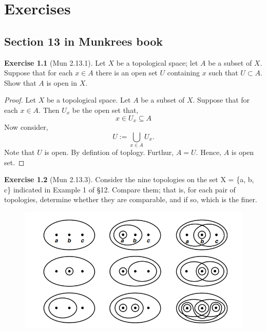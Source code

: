 \documentclass[
]{book}
\theoremstyle{definition}
\theoremstyle{definition}
\theoremstyle{definition}
\newtheorem{exercise}{Exercise}[chapter]
\theoremstyle{definition}
\theoremstyle{remark}
\begin{document}
\hypertarget{exercises}{%
\chapter{Exercises}\label{exercises}}

\hypertarget{section-13-in-munkrees-book}{%
\section{Section 13 in Munkrees book}\label{section-13-in-munkrees-book}}

\begin{exercise}[Mun 2.13.1]
\protect\hypertarget{exr:unnamed-chunk-95}{}\label{exr:unnamed-chunk-95}Let \(X\) be a topological space; let \(A\) be a subset of \(X\). Suppose that for each \(x \in A\) there is an open set \(U\) containing \(x\) such that \(U \subset A\). Show that \(A\) is open in \(X\).
\end{exercise}

\begin{proof}
Let \(X\) be a topological space. Let \(A\) be a subset of \(X\). Suppose that for each \(x \in A\). Then \(U_x\) be the open set that,
\[x\in U_x\subseteq A\]
Now consider,
\[U:=\bigcup_{x\in A}U_x.\]
Note that \(U\) is open. By defintion of toplogy.
Furthur, \(A=U\). Hence, \(A\) is open set.
\end{proof}

\begin{exercise}[Mun 2.13.3]
\protect\hypertarget{exr:unnamed-chunk-97}{}\label{exr:unnamed-chunk-97}Consider the nine topologies on the set X = \{a, b, c\} indicated in Example 1 of §12. Compare them; that is, for each pair of topologies, determine whether they are comparable, and if so, which is the finer.
\end{exercise}

\begin{figure}
\centering
\includegraphics{figures/figure 01.png}
\caption{\label{fig:fig1}\(~\)}
\end{figure}
\end{document}
